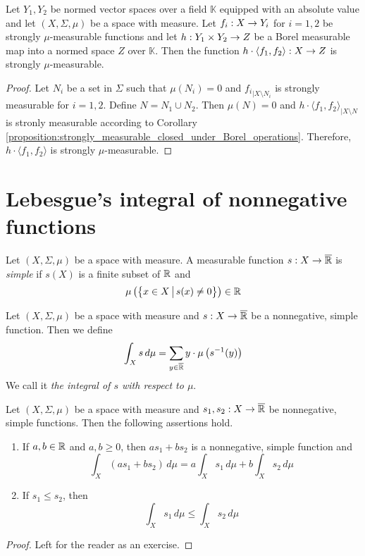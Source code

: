 \begin{corollary}\label{corollary:mu_strongly_measurable_closed_under_Borel_operations}
Let $Y_1, Y_2$ be normed vector spaces over a field $\mathbb{K}$ equipped with an absolute value and let $(X,\Sigma,\mu)$ be a space with measure. Let $f_i:X\rightarrow Y_i$ for $i=1,2$ be strongly $\mu$-measurable functions and let $h:Y_1\times Y_2\rightarrow Z$ be a Borel measurable map into a normed space $Z$ over $\mathbb{K}$. Then the function $h\cdot \langle f_1,f_2\rangle:X\rightarrow Z$ is strongly $\mu$-measurable.
\end{corollary}
\begin{proof}
Let $N_i$ be a set in $\Sigma$ such that $\mu(N_i) = 0$ and ${f_i}_{\mid X\setminus N_i}$ is strongly measurable for $i=1,2$. Define $N = N_1\cup N_2$. Then $\mu(N) = 0$ and $h\cdot \langle f_1,f_2\rangle_{\mid X\setminus N}$ is stronly measurable according to Corollary \ref{proposition:strongly_measurable_closed_under_Borel_operations}. Therefore, $h\cdot \langle f_1,f_2\rangle$ is strongly $\mu$-measurable.
\end{proof}

\section{Lebesgue's integral of nonnegative functions}\label{section:lebesgues_integration}

\begin{definition}
Let $(X,\Sigma,\mu)$ be a space with measure. A measurable function $s:X\rightarrow \overline{{\mathbb R}}$ is \textit{simple} if $s(X)$ is a finite subset of ${\mathbb R}$ and
$$\mu\left(\big\{x\in X\,\big|\,s(x)\neq 0\big\}\right) \in {\mathbb R}$$
\end{definition}

\begin{definition}
Let $(X,\Sigma,\mu)$ be a space with measure and $s:X\rightarrow \overline{{\mathbb R}}$ be a nonnegative, simple function. Then we define
$$\int_Xs\,d\mu = \sum_{y\in \overline{{\mathbb R}}}y\cdot \mu\left(s^{-1}(y)\right)$$
We call it \textit{the integral of $s$ with respect to $\mu$}.
\end{definition}

\begin{fact}\label{fact:basics_for_simple_functions}
Let $(X,\Sigma,\mu)$ be a space with measure and $s_1, s_2:X\rightarrow \overline{{\mathbb R}}$ be nonnegative, simple functions. Then the following assertions hold.
\begin{enumerate}[label=\emph{\textbf{(\arabic*)}}, leftmargin=*]
\item If $a, b\in {\mathbb R}$ and $a, b\geq 0$, then $a s_1 + b s_2$ is a nonnegative, simple function and 
$$\int_X\left(a s_1 + b s_2\right)\,d\mu = a \int_Xs_1\,d\mu + b \int_Xs_2\,d\mu$$
\item If $s_1\leq s_2$, then
$$\int_Xs_1\,d\mu \leq \int_Xs_2\,d\mu$$
\end{enumerate}
\end{fact}
\begin{proof}
Left for the reader as an exercise.
\end{proof}

